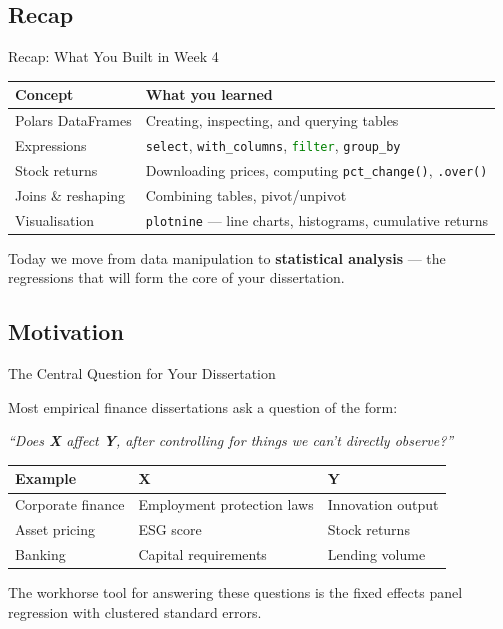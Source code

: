 \documentclass[9pt,aspectratio=169]{beamer}
\newcommand{\py}[1]{\lstinline[language=Python]{#1}}
\begin{document}
\subsection{Recap}
\begin{frame}[fragile]{Recap: What You Built in Week 4}

\begin{tabular}{@{}lp{8cm}@{}}
\toprule
\textbf{Concept} & \textbf{What you learned} \\
\midrule
Polars DataFrames & Creating, inspecting, and querying tables \\[0.3em]
Expressions & \py{select}, \py{with_columns}, \py{filter}, \py{group_by} \\[0.3em]
Stock returns & Downloading prices, computing \py{pct_change()}, \py{.over()} \\[0.3em]
Joins \& reshaping & Combining tables, pivot/unpivot \\[0.3em]
Visualisation & \texttt{plotnine} --- line charts, histograms, cumulative returns \\
\bottomrule
\end{tabular}

\bigskip

\begin{highlightbox}
\centering
Today we move from data manipulation to \textbf{statistical analysis} --- the regressions that will form the core of your dissertation.
\end{highlightbox}

\end{frame}


\subsection{Motivation}
\begin{frame}{The Central Question for Your Dissertation}

Most empirical finance dissertations ask a question of the form:

\bigskip

\centering
\textit{``Does \textbf{X} affect \textbf{Y}, after controlling for things we can't directly observe?''}

\bigskip

\raggedright

\begin{tabular}{@{}lll@{}}
\toprule
\textbf{Example} & \textbf{X} & \textbf{Y} \\
\midrule
Corporate finance & Employment protection laws & Innovation output \\[0.3em]
Asset pricing & ESG score & Stock returns \\[0.3em]
Banking & Capital requirements & Lending volume \\
\bottomrule
\end{tabular}

\bigskip

The workhorse tool for answering these questions is the \alert{fixed effects panel regression} with \alert{clustered standard errors}.

\end{frame}
\end{document}
